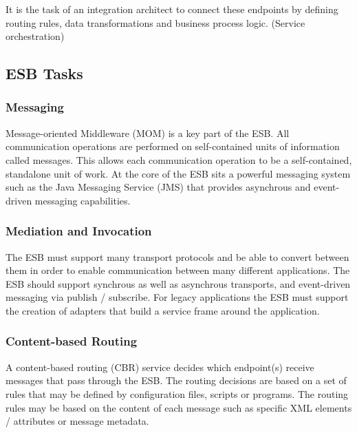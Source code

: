 It is the task of an integration architect to connect these endpoints by
defining routing rules, data transformations and business process logic. (Service
orchestration)


\newpage
\subsection{ESB Tasks}
\label{sec:esb-tasks}

\subsubsection{Messaging}
\label{subsec:messaging}
Message-oriented Middleware (MOM) is a key part of the ESB. All
communication operations are performed on self-contained units of information
called messages. This allows each communication operation to be a
self-contained, standalone unit of work.\supercite{chappell} At the core of the
ESB sits a powerful messaging system such as the Java Messaging Service (JMS)
that provides asynchrous and event-driven messaging capabilities.

\subsubsection{Mediation and Invocation}
\label{subsec:mediation-and-invocation}

The ESB must support many transport protocols and be able to convert between them
in order to enable communication between many different applications. The ESB
should support synchrous as well as asynchrous transports, and event-driven
messaging via publish / subscribe. For legacy applications the ESB must support
the creation of adapters that build a service frame around the application.

\subsubsection{Content-based Routing}
\label{subsec:content-based-routing}

A content-based routing (CBR) service decides which endpoint(s) receive messages
that pass through the ESB. The routing decisions are based on a set of rules
that may be defined by configuration files, scripts or programs. The routing
rules may be based on the content of each message such as specific XML
elements / attributes or message metadata.

